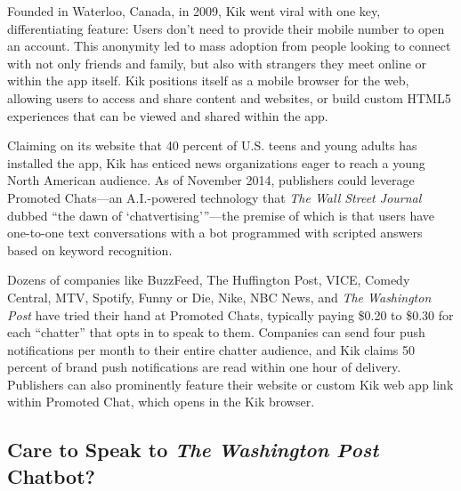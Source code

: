 \documentclass[notoc, symmetric, nobib, nols]{towcenter-guideto-book}
\begin{document}
Founded in Waterloo, Canada, in 2009, Kik went viral with one key, differentiating feature: Users don't need to provide their mobile number to open an account. This anonymity led to mass adoption from people looking to connect with not only friends and family, but also with strangers they meet online or within the app itself. Kik positions itself as a mobile browser for the web, allowing users to access and share content and websites, or build custom HTML5 experiences that can be viewed and shared within the app.

Claiming on its website that 40 percent of U.S. teens and young adults has installed the app, Kik has enticed news organizations eager to reach a young North American audience.\autocite{ForbesKik} As of November 2014, publishers could leverage Promoted Chats---an A.I.-powered technology that \textit{The Wall Street Journal} dubbed ``the dawn of `chatvertising'''\autocite{WSJKik}---the premise of which is that users have one-to-one text conversations with a bot programmed with scripted answers based on keyword recognition. 

Dozens of companies like BuzzFeed, The Huffington Post, VICE, Comedy Central, MTV, Spotify, Funny or Die, Nike, NBC News, and \textit{The Washington Post} have tried their hand at Promoted Chats, typically paying \$0.20 to \$0.30 for each ``chatter'' that opts in to speak to them. Companies can send four push notifications per month to their entire chatter audience, and Kik claims 50 percent of brand push notifications are read within one hour of delivery. Publishers can also prominently feature their website or custom Kik web app link within Promoted Chat, which opens in the Kik browser.

\subsection[Care to Speak to the Washington Post Chatbot?]{Care to Speak to \textit{The Washington Post} Chatbot?}
\end{document}

